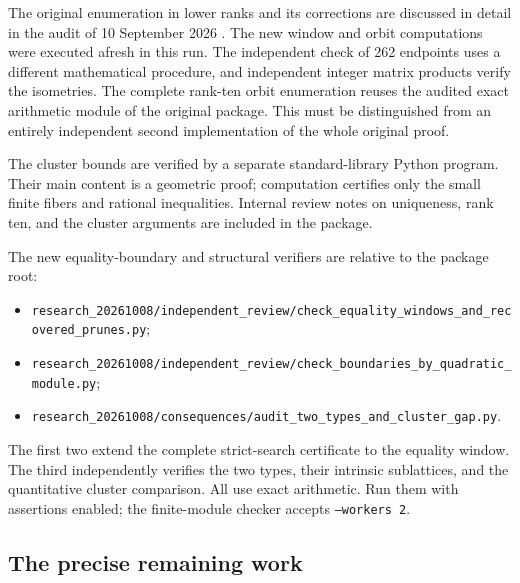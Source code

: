 \documentclass[11pt,a4paper]{article}
\theoremstyle{remark}\newtheorem{remark}[theorem]{Remark}
\newcommand{\file}[1]{{\small\nolinkurl{#1}}}
\begin{document}
The original enumeration in lower ranks and its corrections are discussed in detail in the audit of 10 September 2026 \cite{audit}. The new window and orbit computations were executed afresh in this run. The independent check of 262 endpoints uses a different mathematical procedure, and independent integer matrix products verify the isometries. The complete rank-ten orbit enumeration reuses the audited exact arithmetic module of the original package. This must be distinguished from an entirely independent second implementation of the whole original proof.

The cluster bounds are verified by a separate standard-library Python program. Their main content is a geometric proof; computation certifies only the small finite fibers and rational inequalities. Internal review notes on uniqueness, rank ten, and the cluster arguments are included in the package.

\Needspace{8cm}
The new equality-boundary and structural verifiers are relative to the package root:
\begin{itemize}
\item \file{research_20261008/independent_review/check_equality_windows_and_recovered_prunes.py};
\item \file{research_20261008/independent_review/check_boundaries_by_quadratic_module.py};
\item \file{research_20261008/consequences/audit_two_types_and_cluster_gap.py}.
\end{itemize}
The first two extend the complete strict-search certificate to the equality window. The third independently verifies the two types, their intrinsic sublattices, and the quantitative cluster comparison. All use exact arithmetic. Run them with assertions enabled; the finite-module checker accepts \texttt{--workers 2}.

\subsection{The precise remaining work}
\end{document}
